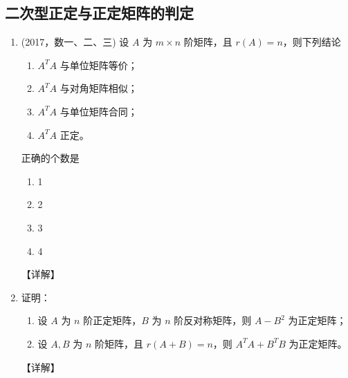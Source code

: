 \documentclass[12pt, a4paper, oneside, UTF8]{ctexbook}
\begin{document}
\subsection{二次型正定与正定矩阵的判定}

\begin{enumerate}[label=\arabic*.,start=6]
    \item (2017，数一、二、三) 设 $ A $ 为 $ m \times n $ 阶矩阵，且 $ r(A) = n $，则下列结论
    \begin{enumerate}
        \item $ A^T A $ 与单位矩阵等价；
        \item $ A^T A $ 与对角矩阵相似；
        \item $ A^T A $ 与单位矩阵合同；
        \item $ A^T A $ 正定。
    \end{enumerate}
    正确的个数是
    \begin{enumerate}
        \item 1
        \item 2
        \item 3
        \item 4
    \end{enumerate}
    
    \begin{solution}
    【详解】
    \end{solution}
    
    \item 证明：
    \begin{enumerate}
        \item 设 $ A $ 为 $ n $ 阶正定矩阵，$ B $ 为 $ n $ 阶反对称矩阵，则 $ A - B^2 $ 为正定矩阵；
        \item 设 $ A, B $ 为 $ n $ 阶矩阵，且 $ r(A + B) = n $，则 $ A^T A + B^T B $ 为正定矩阵。
    \end{enumerate}
    
    \begin{solution}
    【详解】
    \end{solution}
\end{enumerate}

\ifx\allfiles\undefined
\end{document}
